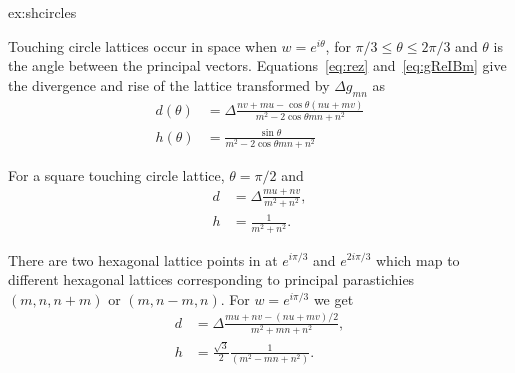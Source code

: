 \begin{jAnswer}{ex:shcircles}{
Touching circle lattices occur in  space when $w=e^{i\theta}$, for $\pi/3\leq\theta\leq2\pi/3$ and $\theta$ is the angle between the principal vectors. 
Equations~\eqref{eq:rez} and~\eqref{eq:gReIBm} give the divergence and rise of the lattice transformed by $\Delta g_{mn}$ as 
\begin{align}
	d(\theta) &= 
	\Delta \frac{n v + m u	- \cos\theta ( n u + m v)}{m^2-2 \cos \theta mn +n^2   } 
	\\
	h(\theta) &=
	\frac{	\sin\theta}{m^2-2 \cos \theta mn +n^2   }
	\label{eq:tchd}
\end{align}

For a square touching circle lattice, $\theta=\pi/2$ and 
\begin{align}
	d &= \Delta \frac{ m u +  n v   }{m^2 +  n^2},
	\\
	h  &= \frac{1}{m^2 + n^2}.
\end{align}

There are two hexagonal lattice points in  at $e^{i\pi/3}$ and $e^{2i\pi/3}$ which map to different hexagonal lattices corresponding to principal parastichies  $(m,n,n+m)$ or  $(m,n-m,n)$. For $w= e^{i\pi/3}$ we get
	\begin{align}
	d &= \Delta \frac{ m u +  n v- (n u + mv)/2   }{m^2 + m n + n^2},
	\\
	h  &= \frac{\sqrt{3}}{2} \frac{1}{\left(m^2 -  mn +n^2 \right)}  .
	\end{align}
}
\end{jAnswer}

